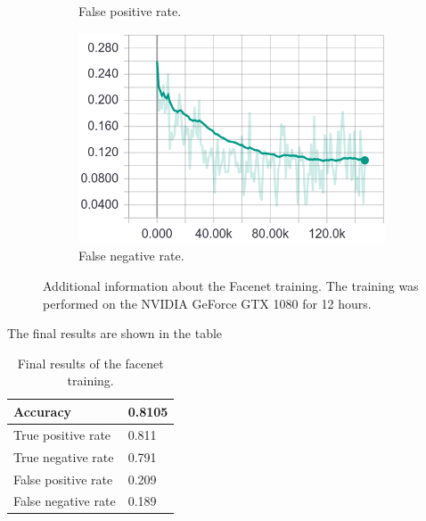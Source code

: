 \documentclass[a4paper,12pt,titlepage]{article}
\numberwithin{figure}{section}
\begin{document}
\begin{figure}[H]
\begin{subfigure}[Sample1]{0.5\linewidth}
        \caption{False positive rate.}   
        \label{fig:facenet}
    \end{subfigure}
    \begin{subfigure}[Sample1]{0.5\linewidth} 
    	\includegraphics[width=0.95\linewidth]{fig/facenet/fnr.png}
        \caption{False negative rate.}   
        \label{fig:facenet}
    \end{subfigure}       
    \caption{Additional information about the Facenet training. The training was performed on the NVIDIA GeForce GTX 1080 for 12 hours.}
    \label{fig:facenet_training_additional}
\end{figure}

The final results are shown in the table 

\begin{table}
\centering
\begin{tabular}{|l|l|}
  \hline
  Accuracy & 0.8105 \\
  \hline
  True positive rate & 0.811 \\
  \hline
  True negative rate & 0.791 \\
  \hline
  False positive rate & 0.209 \\
  \hline
  False negative rate & 0.189 \\
  \hline
\end{tabular}
\caption{Final results of the facenet training.}
\label{tab:facenet}
\end{table}
\end{document}
